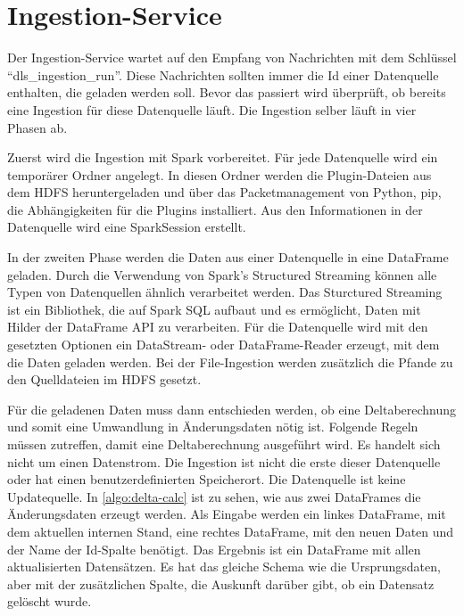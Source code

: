 \section{Ingestion-Service}

Der Ingestion-Service wartet auf den Empfang von Nachrichten mit dem Schlüssel "`dls\_ingestion\_run"'.
Diese Nachrichten sollten immer die Id einer Datenquelle enthalten, die geladen werden soll.
Bevor das passiert wird überprüft, ob bereits eine Ingestion für diese Datenquelle läuft.
Die Ingestion selber läuft in vier Phasen ab.

Zuerst wird die Ingestion mit Spark vorbereitet.
Für jede Datenquelle wird ein temporärer Ordner angelegt.
In diesen Ordner werden die Plugin-Dateien aus dem HDFS heruntergeladen und über das Packetmanagement von Python, pip, die Abhängigkeiten für die Plugins installiert.
Aus den Informationen in der Datenquelle wird eine SparkSession erstellt.

In der zweiten Phase werden die Daten aus einer Datenquelle in eine DataFrame geladen.
Durch die Verwendung von Spark's Structured Streaming können alle Typen von Datenquellen ähnlich verarbeitet werden.
Das Sturctured Streaming ist ein Bibliothek, die auf Spark SQL aufbaut und es ermöglicht, Daten mit Hilder der DataFrame API zu verarbeiten.
Für die Datenquelle wird mit den gesetzten Optionen ein DataStream- oder DataFrame-Reader erzeugt, mit dem die Daten geladen werden.
Bei der File-Ingestion werden zusätzlich die Pfande zu den Quelldateien im HDFS gesetzt.

Für die geladenen Daten muss dann entschieden werden, ob eine Deltaberechnung und somit eine Umwandlung in Änderungsdaten nötig ist.
Folgende Regeln müssen zutreffen, damit eine Deltaberechnung ausgeführt wird.
Es handelt sich nicht um einen Datenstrom.
Die Ingestion ist nicht die erste dieser Datenquelle oder hat einen benutzerdefinierten Speicherort.
Die Datenquelle ist keine Updatequelle.
In \cref{algo:delta-calc} ist zu sehen, wie aus zwei DataFrames die Änderungsdaten erzeugt werden.
Als Eingabe werden ein linkes DataFrame, mit dem aktuellen internen Stand, eine rechtes DataFrame, mit den neuen Daten und der Name der Id-Spalte benötigt.
Das Ergebnis ist ein DataFrame mit allen aktualisierten Datensätzen.
Es hat das gleiche Schema wie die Ursprungsdaten, aber mit der zusätzlichen Spalte, die Auskunft darüber gibt, ob ein Datensatz gelöscht wurde.

